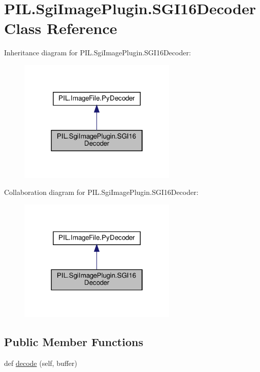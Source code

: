 \hypertarget{classPIL_1_1SgiImagePlugin_1_1SGI16Decoder}{}\section{P\+I\+L.\+Sgi\+Image\+Plugin.\+S\+G\+I16\+Decoder Class Reference}
\label{classPIL_1_1SgiImagePlugin_1_1SGI16Decoder}


Inheritance diagram for P\+I\+L.\+Sgi\+Image\+Plugin.\+S\+G\+I16\+Decoder\+:
\nopagebreak
\begin{figure}[H]
\begin{center}
\leavevmode
\includegraphics[width=214pt]{classPIL_1_1SgiImagePlugin_1_1SGI16Decoder__inherit__graph}
\end{center}
\end{figure}


Collaboration diagram for P\+I\+L.\+Sgi\+Image\+Plugin.\+S\+G\+I16\+Decoder\+:
\nopagebreak
\begin{figure}[H]
\begin{center}
\leavevmode
\includegraphics[width=214pt]{classPIL_1_1SgiImagePlugin_1_1SGI16Decoder__coll__graph}
\end{center}
\end{figure}
\subsection*{Public Member Functions}
\begin{DoxyCompactItemize}
\item 
def \hyperlink{classPIL_1_1SgiImagePlugin_1_1SGI16Decoder_abf1cf1d9f0827045c49f0b2604d353fe}{decode} (self, buffer)
\end{DoxyCompactItemize}
